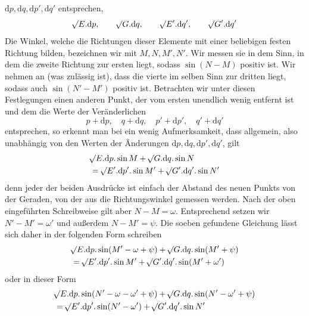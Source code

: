 %
\(\mathrm{d}p,\mathrm{d}q,\mathrm{d}p',\mathrm{d}q'\) entsprechen,
\[
\mathord{{}^{}\!\surd}E\mathord{.}\mathrm{d}p,\qquad\mathord{{}^{}\!\surd}G\mathord{.}\mathrm{d}q,\qquad\mathord{{}^{}\!\surd}E'\mathord{.}\mathrm{d}q',\qquad\mathord{{}^{}\!\surd}G'\mathord{.}\mathrm{d}q'
\]
Die Winkel, welche die Richtungen dieser Elemente mit einer beliebigen festen Richtung bilden, bezeichnen wir mit \(M,N,M',N'\). Wir messen sie in dem Sinn, in dem die zweite Richtung zur ersten liegt, sodass \(\sin(N-M)\) positiv ist. Wir nehmen an (was zulässig ist), dass die vierte im selben Sinn zur dritten liegt, sodass auch \(\sin(N'-M')\) positiv ist. Betrachten wir unter diesen Festlegungen einen anderen Punkt, der vom ersten unendlich wenig entfernt ist und dem die Werte der Veränderlichen
\[
p+\mathrm{d}p,\quad q+\mathrm{d}q,\quad p'+\mathrm{d}p',\quad q'+\mathrm{d}q'
\]
entsprechen, so erkennt man bei ein wenig Aufmerksamkeit, dass allgemein, also unabhängig von den Werten der Änderungen \(\mathrm{d}p,\mathrm{d}q,\mathrm{d}p',\mathrm{d}q'\), gilt
\[
\begin{aligned}
&\mathord{{}^{}\!\surd}E\mathord{.}\mathrm{d}p\mathord{.}\sin M+\mathord{{}^{}\!\surd}G\mathord{.}\mathrm{d}q\mathord{.}\sin N\\
&=\mathord{{}^{}\!\surd}E'\mathord{.}\mathrm{d}p'\mathord{.}\sin M'+\mathord{{}^{}\!\surd}G'\mathord{.}\mathrm{d}q'\mathord{.}\sin N'
\end{aligned}
\]
denn jeder der beiden Ausdrücke ist einfach der Abstand des neuen Punkts von der Geraden, von der aus die Richtungswinkel gemessen werden. Nach der oben eingeführten Schreibweise gilt aber \(N-M=\omega\). Entsprechend setzen wir \(N'-M'=\omega'\) und außerdem \(N-M'=\psi\). Die soeben gefundene Gleichung lässt sich daher in der folgenden Form schreiben
\[
\begin{aligned}
&\mathord{{}^{}\!\surd}E\mathord{.}\mathrm{d}p\mathord{.}\sin(M'-\omega+\psi)+\mathord{{}^{}\!\surd}G\mathord{.}\mathrm{d}q\mathord{.}\sin(M'+\psi)\\
&=\mathord{{}^{}\!\surd}E'\mathord{.}\mathrm{d}p'\mathord{.}\sin M'+\mathord{{}^{}\!\surd}G'\mathord{.}\mathrm{d}q'\mathord{.}\sin(M'+\omega')
\end{aligned}
\]
oder in dieser Form
\[
\begin{aligned}
&\mathord{{}^{}\!\surd}E\mathord{.}\mathrm{d}p\mathord{.}\sin(N'-\omega-\omega'+\psi)+\mathord{{}^{}\!\surd}G\mathord{.}\mathrm{d}q\mathord{.}\sin(N'-\omega'+\psi)\\
&=\mathord{{}^{}\!\surd}E'\mathord{.}\mathrm{d}p'\mathord{.}\sin(N'-\omega')+\mathord{{}^{}\!\surd}G'\mathord{.}\mathrm{d}q'\mathord{.}\sin N'
\end{aligned}
\]

